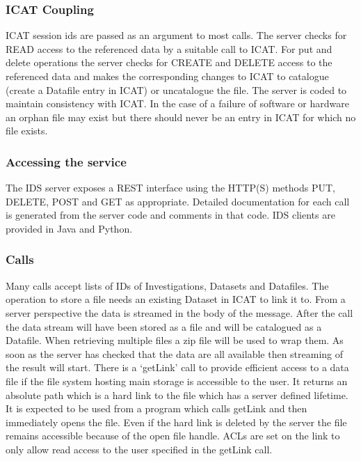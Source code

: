 \documentclass[a4paper]{jpconf}
\begin{document}
\subsubsection{ICAT Coupling}
ICAT session ids are passed as an argument to most calls. The server
checks for READ access to the referenced data by a suitable call to
ICAT. For put and delete operations the server checks for CREATE and
DELETE access to the referenced data and makes the corresponding
changes to ICAT to catalogue (create a Datafile entry in ICAT) or
uncatalogue the file. The server is coded to maintain consistency with
ICAT. In the case of a failure of software or hardware an orphan file
may exist but there should never be an entry in ICAT for which no file
exists.

\subsubsection{Accessing the service}
The IDS server exposes a REST interface using the HTTP(S) methods PUT,
DELETE, POST and GET as appropriate. Detailed documentation for each
call is generated from the server code and comments in that code.  IDS
clients are provided in Java and Python.

\subsubsection{Calls}
Many calls accept lists of IDs of Investigations, Datasets and
Datafiles. The operation to store a file needs an existing Dataset in
ICAT to link it to. From a server perspective the data is streamed in
the body of the message. After the call the data stream will have been
stored as a file and will be catalogued as a Datafile.  When
retrieving multiple files a zip file will be used to wrap them.  As
soon as the server has checked that the data are all available then
streaming of the result will start. There is a `getLink' call to
provide efficient access to a data file if the file system hosting
main storage is accessible to the user. It returns an absolute path
which is a hard link to the file which has a server defined
lifetime. It is expected to be used from a program which calls getLink
and then immediately opens the file. Even if the hard link is deleted
by the server the file remains accessible because of the open file
handle. ACLs are set on the link to only allow read access to the user
specified in the getLink call.
\end{document}
